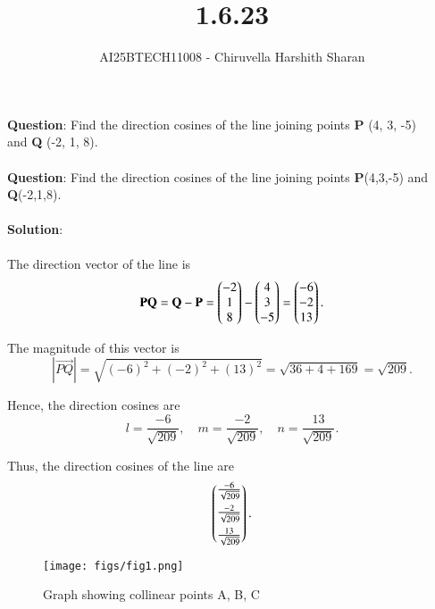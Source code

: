 \documentclass[journal]{IEEEtran}
\begin{document}

\vspace{3cm}

\title{1.6.23}
\author{AI25BTECH11008 - Chiruvella Harshith Sharan}
{\let\newpage\relax\maketitle}

\renewcommand{\thefigure}{\theenumi}
\renewcommand{\thetable}{\theenumi}
\setlength{\intextsep}{10pt} 

\renewcommand{\thetable}{\theenumi}

\textbf{Question}: Find the direction cosines of the line joining points \textbf{P} (4, 3, -5)\\ \hspace*{1.2cm} and \textbf{Q} (-2, 1, 8).\\\\

\textbf{Question}: Find the direction cosines of the line joining points 
\textbf{P}(4,3,-5) and \textbf{Q}(-2,1,8). \\\\[0.3cm]

\textbf{Solution}: \\\\[0.3cm]

The direction vector of the line is
\[
\mathbf{PQ} = \mathbf{Q} - \mathbf{P} 
= \begin{pmatrix}-2 \\ 1 \\ 8\end{pmatrix} - \begin{pmatrix}4 \\ 3 \\ -5\end{pmatrix}
= \begin{pmatrix}-6 \\ -2 \\ 13\end{pmatrix}.
\]

\vspace{0.3cm}

The magnitude of this vector is
\[
|\vec{PQ}| = \sqrt{(-6)^2 + (-2)^2 + (13)^2}
= \sqrt{36+4+169}
= \sqrt{209}.
\]

\vspace{0.3cm}

Hence, the direction cosines are
\[
l = \frac{-6}{\sqrt{209}}, \quad 
m = \frac{-2}{\sqrt{209}}, \quad 
n = \frac{13}{\sqrt{209}}.
\]

\vspace{0.3cm}

Thus, the direction cosines of the line are
\[
\begin{pmatrix}\tfrac{-6}{\sqrt{209}} \\[6pt] \tfrac{-2}{\sqrt{209}} \\[6pt] \tfrac{13}{\sqrt{209}} \end{pmatrix}.
\]

\begin{figure}[htbp]
    \centering
    \texttt{[image: figs/fig1.png]}
    \caption{Graph showing collinear points A, B, C}
    \label{fig:fig/fig1.png}
\end{figure}
\end{document}
